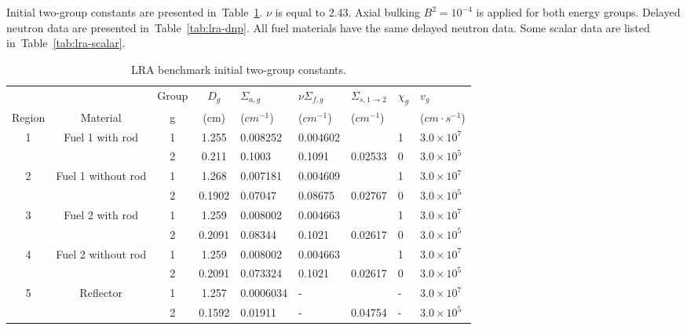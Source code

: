 \documentclass[12pt]{scrartcl}
\newcommand{\tbl}[1]{Table~\ref{#1}}                     %
\begin{document}
Initial two-group constants are presented in~\tbl{tab:lra-xs}.
$\nu$ is equal to 2.43.
Axial bulking $B^2 = 10^{-4}$ is applied for both energy groups.
Delayed neutron data are presented in~\tbl{tab:lra-dnp}.
All fuel materials have the same delayed neutron data.
Some scalar data are listed in~\tbl{tab:lra-scalar}.\\
\begin{table}[H]
    \centering
    \caption{LRA benchmark initial two-group constants.\label{tab:lra-xs}}
      \begin{tabular}{|c|c|c|c|l|l|l|l|l|}
      \hline
             &                 & Group   & $D_g$      & $\Sigma_{a,g}$ & $\nu\Sigma_{f,g}$ & $\Sigma_{s,1\rightarrow 2}$ & $\chi_g$ & $v_g$              \\
      Region & Material        &       g & (cm)       &  ($cm^{-1}$)   &  ($cm^{-1}$)      &  ($cm^{-1}$)                &          & ($cm\cdot s^{-1}$) \\
      \hline
      1      & Fuel 1 with rod & 1       & 1.255      & 0.008252       & 0.004602          &                             & 1        & $3.0\times10^7$    \\
             &                 & 2       & 0.211      & 0.1003         & 0.1091            & 0.02533                     & 0        & $3.0\times10^5$    \\
      \hline
      2      & Fuel 1 without rod & 1    & 1.268      & 0.007181       & 0.004609          &                             & 1        & $3.0\times10^7$    \\
             &                    & 2    & 0.1902     & 0.07047        & 0.08675           & 0.02767                     & 0        & $3.0\times10^5$    \\
      \hline
      3      & Fuel 2 with rod & 1       & 1.259      & 0.008002       & 0.004663          &                             & 1        & $3.0\times10^7$    \\
             &                 & 2       & 0.2091     & 0.08344        & 0.1021            & 0.02617                     & 0        & $3.0\times10^5$    \\
      \hline
      4      & Fuel 2 without rod & 1    & 1.259      & 0.008002       & 0.004663          &                             & 1        & $3.0\times10^7$    \\
             &                    & 2    & 0.2091     & 0.073324       & 0.1021            & 0.02617                     & 0        & $3.0\times10^5$    \\
      \hline
      5      & Reflector        & 1      & 1.257      & 0.0006034      & -                 &                             & -        & $3.0\times10^7$    \\
             &                  & 2      & 0.1592     & 0.01911        & -                 & 0.04754                     & -        & $3.0\times10^5$    \\
      \hline
      \end{tabular}
\end{table}
\end{document}
